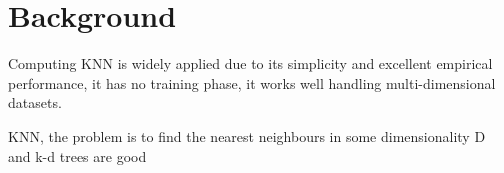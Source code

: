 \section{Background}
\label{sec:back}
%
%
%




Computing KNN is widely applied due to its simplicity and excellent empirical performance, it has no training phase, it works well handling multi-dimensional datasets. 

KNN, the problem is to find the nearest neighbours in some dimensionality D and k-d trees are good 

